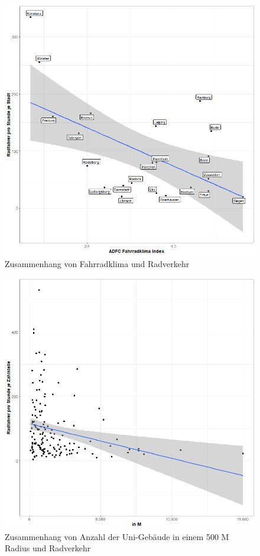 \documentclass[a4paper,12pt]{thesis}
\begin{document}
\begin{figure}[!ht]
	\centering
	\includegraphics[width=\textwidth]{Plots/plot05.png}
	\caption{Zusammenhang von Fahrradklima und Radverkehr}
	\label{Fahrradklima}
\end{figure}

\begin{figure}[!ht]
	\centering
	\includegraphics[width=\textwidth]{Plots/plot13.png}
	\caption{Zusammenhang von Anzahl der Uni-Gebäude in einem 500 M Radius und Radverkehr}
	\label{UniBuild}
\end{figure}
\end{document}
